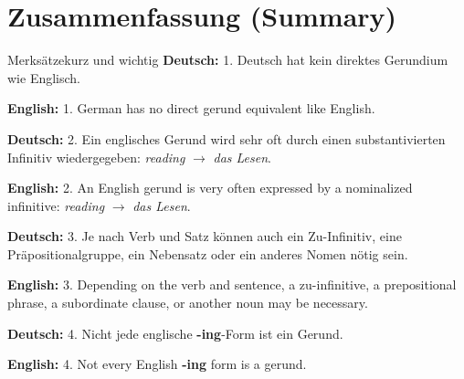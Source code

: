 \documentclass[a4paper,11pt]{article}
\newcommand{\GermanText}[1]{\textbf{Deutsch: }#1\par}
\newcommand{\EnglishText}[1]{{\small\color{SoftGray}\textbf{English: }#1\par}}
\begin{document}
\section{Zusammenfassung \textnormal{(Summary)}}
\begin{grammarentry}{Merksätze}{kurz und wichtig}
\GermanText{1. Deutsch hat kein direktes Gerundium wie Englisch.}
\EnglishText{1. German has no direct gerund equivalent like English.}

\GermanText{2. Ein englisches Gerund wird sehr oft durch einen substantivierten Infinitiv wiedergegeben: \textit{reading} $\rightarrow$ \textit{das Lesen}.}
\EnglishText{2. An English gerund is very often expressed by a nominalized infinitive: \textit{reading} $\rightarrow$ \textit{das Lesen}.}

\GermanText{3. Je nach Verb und Satz können auch ein Zu-Infinitiv, eine Präpositionalgruppe, ein Nebensatz oder ein anderes Nomen nötig sein.}
\EnglishText{3. Depending on the verb and sentence, a zu-infinitive, a prepositional phrase, a subordinate clause, or another noun may be necessary.}

\GermanText{4. Nicht jede englische \textbf{-ing}-Form ist ein Gerund.}
\EnglishText{4. Not every English \textbf{-ing} form is a gerund.}
\end{grammarentry}
\end{document}
